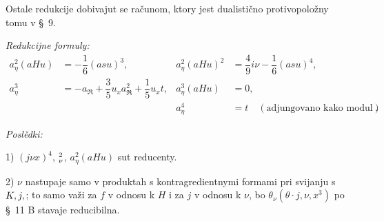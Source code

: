 \documentclass[11pt]{article}
\let\A\relax
\newcommand{\A}{\mathfrak A}
\newcommand{\R}{\mathfrak R}
\begin{document}
Ostale redukcije dobivajut se računom, ktory jest dualistično protivopoložny tomu v \S\ 9.

\noindent\textit{Redukcijne formuly:}
\[
\tag{11}
\begin{array}{rl|rl}
a_\eta^2(aHu)&=-\dfrac16(asu)^3,&
 a_\eta^2(aHu)^2&=\dfrac49 i\nu-\dfrac16(asu)^4,\\[0.7em]
a_\eta^3&=-a_\R+\dfrac35u_xa_\R^2+\dfrac15u_xt,
& a_\eta^3(aHu)&=0,\\[0.7em]
&&a_\eta^4&=t\quad(\text{adjungovano kako modul}).
\end{array}
\]

\noindent\textit{Poslědki:}

1) $(j\nu x)^4$, $\A_\nu^2$, $a_\eta^2(aHu)$ sut reducenty.

2) $\nu$ nastupaje samo v produktah s kontragredientnymi formami pri svijanju s $K,j,\A$; to samo važi za $f$ v odnosu k $H$ i za $j$ v odnosu k $\nu$, bo $\theta_\nu(\theta\cdot j,\nu,x^3)$ po \S\ 11 \mbox{B} stavaje reducibilna.
\end{document}
